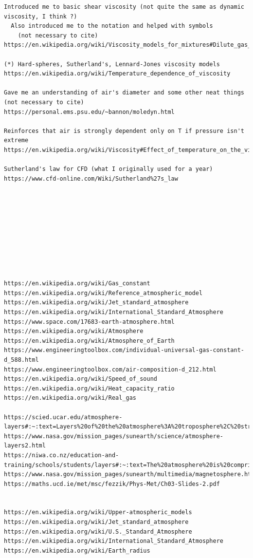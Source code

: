\documentclass[11pt,dvipsnames]{thesis}
\begin{document}
\begin{verbatim}
Introduced me to basic shear viscosity (not quite the same as dynamic viscosity, I think ?)
  Also introduced me to the notation and helped with symbols
  	(not necessary to cite)
https://en.wikipedia.org/wiki/Viscosity_models_for_mixtures#Dilute_gas_limit_and_scaled_variables

(*) Hard-spheres, Sutherland's, Lennard-Jones viscosity models
https://en.wikipedia.org/wiki/Temperature_dependence_of_viscosity

Gave me an understanding of air's diameter and some other neat things (not necessary to cite)
https://personal.ems.psu.edu/~bannon/moledyn.html

Reinforces that air is strongly dependent only on T if pressure isn't extreme
https://en.wikipedia.org/wiki/Viscosity#Effect_of_temperature_on_the_viscosity_of_a_gas

Sutherland's law for CFD (what I originally used for a year)
https://www.cfd-online.com/Wiki/Sutherland%27s_law










https://en.wikipedia.org/wiki/Gas_constant
https://en.wikipedia.org/wiki/Reference_atmospheric_model
https://en.wikipedia.org/wiki/Jet_standard_atmosphere
https://en.wikipedia.org/wiki/International_Standard_Atmosphere
https://www.space.com/17683-earth-atmosphere.html
https://en.wikipedia.org/wiki/Atmosphere
https://en.wikipedia.org/wiki/Atmosphere_of_Earth
https://www.engineeringtoolbox.com/individual-universal-gas-constant-d_588.html
https://www.engineeringtoolbox.com/air-composition-d_212.html
https://en.wikipedia.org/wiki/Speed_of_sound
https://en.wikipedia.org/wiki/Heat_capacity_ratio
https://en.wikipedia.org/wiki/Real_gas

https://scied.ucar.edu/atmosphere-layers#:~:text=Layers%20of%20the%20atmosphere%3A%20troposphere%2C%20stratosphere%2C%20mesosphere%20and,named%20the%20troposphere%2C%20stratosphere%2C%20mesosphere%2C%20thermosphere%20and%20exosphere.
https://www.nasa.gov/mission_pages/sunearth/science/atmosphere-layers2.html
https://niwa.co.nz/education-and-training/schools/students/layers#:~:text=The%20atmosphere%20is%20comprised%20of%20layers%20based%20on,above%20the%20Earth%27s%20surface%20is%20called%20the%20exosphere.
https://www.nasa.gov/mission_pages/sunearth/multimedia/magnetosphere.html
https://maths.ucd.ie/met/msc/fezzik/Phys-Met/Ch03-Slides-2.pdf


https://en.wikipedia.org/wiki/Upper-atmospheric_models
https://en.wikipedia.org/wiki/Jet_standard_atmosphere
https://en.wikipedia.org/wiki/U.S._Standard_Atmosphere
https://en.wikipedia.org/wiki/International_Standard_Atmosphere
https://en.wikipedia.org/wiki/Earth_radius


\end{verbatim}
\end{document}
